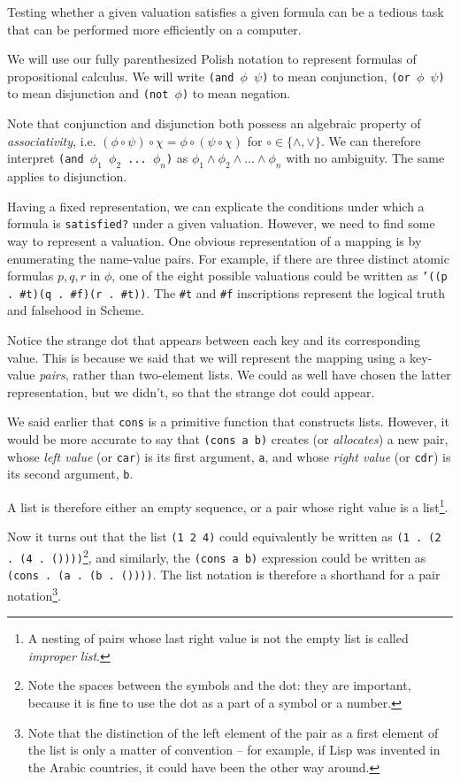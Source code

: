 Testing whether a given valuation satisfies a given formula
can be a tedious task that can be performed more efficiently
on a computer.

We will use our fully parenthesized Polish notation to represent
formulas of propositional calculus. We will write
\texttt{(and $\phi$ $\psi$)} to mean conjunction,
\texttt{(or $\phi$ $\psi$)} to mean disjunction and
\texttt{(not $\phi$)} to mean negation.

Note that conjunction and disjunction both possess an algebraic
property of \textit{associativity}, i.e. 
$(\phi \circ \psi) \circ \chi = \phi \circ (\psi \circ \chi)$ for
$\circ \in \{ \wedge, \vee \}$. We can therefore interpret
\texttt{(and $\phi_1$ $\phi_2$ ... $\phi_n$)} as
$\phi_1 \wedge \phi_2 \wedge ... \wedge \phi_n$ with no ambiguity.
The same applies to disjunction.

Having a fixed representation, we can explicate the conditions
under which a formula is \texttt{satisfied?} under a given valuation.
However, we need to find some way to represent a valuation.
One obvious representation of a mapping
is by enumerating the name-value pairs. For example, if there
are three distinct atomic formulas $p,q,r$ in $\phi$, one of
the eight possible valuations could be written as
\texttt{'((p . \#t)(q . \#f)(r . \#t))}. The \texttt{\#t} and
\texttt{\#f} inscriptions represent the logical truth and
falsehood in Scheme.

Notice the strange dot that appears between each key and its
corresponding value. This is because we said that we will
represent the mapping using a key-value \textit{pairs}, rather
than two-element lists. We could as well have chosen the
latter representation, but we didn't, so that the strange
dot could appear.

We said earlier that \texttt{cons} is a primitive function
that constructs lists. However, it would be more accurate
to say that \texttt{(cons a b)} creates (or \textit{allocates})
a new pair, whose \textit{left value} (or \texttt{car})
is its first argument, \texttt{a}, and whose \textit{right value}
(or \texttt{cdr}) is its second argument, \texttt{b}.

A list is therefore either an empty sequence, or a pair
whose right value is a list\footnote{A nesting of pairs
whose last right value is not the empty list is called
\textit{improper list}.}.

Now it turns out that the list \texttt{(1 2 4)} could
equivalently be written as \texttt{(1 . (2 . (4 . ())))}\footnote{
Note the spaces between the symbols and the dot: they are important,
because it is fine to use the dot as a part of a symbol or a number.},
and similarly, the \texttt{(cons a b)}
expression could be written as \texttt{(cons . (a . (b . ())))}.
The list notation is therefore a shorthand for a pair
notation\footnote{Note that the distinction of the left element
of the pair as a first element of the list is only a matter
of convention -- for example, if Lisp was invented in the Arabic
countries, it could have been the other way around.}.

